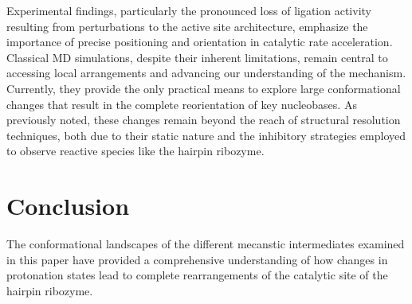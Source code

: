 \documentclass[journal=jacsat,manuscript=article]{achemso}
\begin{document}
Experimental findings, particularly the pronounced loss of ligation activity resulting from perturbations
to the active site architecture, emphasize the importance of precise positioning and orientation
in catalytic rate acceleration.
Classical MD simulations, despite their inherent limitations, remain central to accessing local arrangements
and advancing our understanding of the mechanism.
Currently, they provide the only practical means to explore large conformational changes 
that result in the complete reorientation of key nucleobases.
As previously noted, these changes remain beyond the reach of structural resolution techniques,
both due to their static nature and the inhibitory strategies employed
to observe reactive species like the hairpin ribozyme.

\section{Conclusion}

The conformational landscapes of the different mecanstic intermediates examined in this paper have provided a comprehensive understanding of how changes in protonation states lead to complete rearrangements of the catalytic site of the hairpin ribozyme. 




\end{document}
